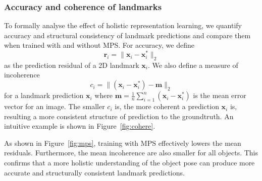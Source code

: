 \documentclass[10pt,twocolumn,letterpaper]{article}
\newcommand{\bx}{\bm{x}}
\begin{document}
\subsubsection{Accuracy and coherence of landmarks}



To formally analyse the effect of holistic representation learning, we quantify accuracy and structural consistency of landmark predictions and compare them when trained with and without MPS. For accuracy, we define 
\begin{equation}
    \bm r_i = \lVert \bx_i - \bx_i^* \rVert_2
\end{equation}
as the prediction residual of a 2D landmark $\bx_i$. We also define a measure of incoherence 
\begin{equation}
    c_i = \lVert (\bx_i - \bx_i^*)-\bm m \rVert_2
\end{equation}
for a landmark prediction $\bx_i$ where $\bm m = \frac{1}{n}\sum_{i=1}^n (\bx_i - \bx_i^*)$ is the mean error vector for an image. The smaller $c_i$ is, the more coherent a prediction $\bx_i$ is, resulting a more consistent structure of prediction to the groundtruth. An intuitive example is shown in Figure~\ref{fig:cohere}.




As shown in Figure~\ref{fig:mps}, training with MPS effectively lowers the mean residuals. Furthermore, the mean incoherence are also smaller for all objects. This confirms that a more holistic understanding of the object pose can produce more accurate and structurally consistent landmark predictions. 
\end{document}
